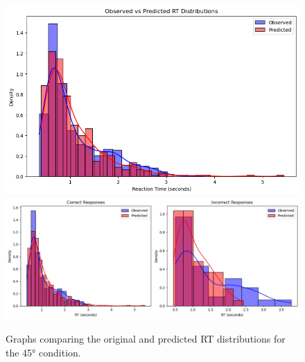\documentclass[12pt]{article}
\begin{document}
\begin{figure}[ht]
    \centering
    \includegraphics[scale=.4]{45_deg_obvs_vs_pred.png}
    \includegraphics[scale=.4]{45_deg_obvs_vs_pred_by_c.png}
    \caption{Graphs comparing the original and predicted RT distributions for the 45° condition.}
    \label{fig:45deg}
\end{figure}
\end{document}
